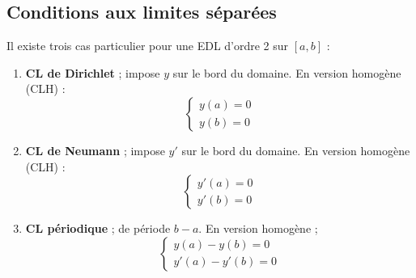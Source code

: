 \documentclass	[11pt, a4paper, openany]{book}
\begin{document}
			\subsection{Conditions aux limites séparées}
			Il existe trois cas particulier pour une EDL d'ordre 2 sur $[a,b]$ :
			\begin{enumerate}
				\item \textbf{CL de Dirichlet} ; impose $y$ sur le bord du domaine. En version homogène (CLH) :
				      \begin{equation}
				      	\left\{\begin{array}{l}
				      	y(a) = 0\\
				      	y(b) = 0
				      	\end{array}\right.
				      \end{equation}
				\item \textbf{CL de Neumann} ; impose $y'$ sur le bord du domaine. En version homogène (CLH) :
				      \begin{equation}
				      	\left\{\begin{array}{l}
				      	y'(a) = 0\\
				      	y'(b) = 0
				      	\end{array}\right.
				      \end{equation}
				\item \textbf{CL périodique} ; de période $b-a$. En version homogène ;
				      \begin{equation}
				      	\left\{\begin{array}{l}
				      	y(a)-y(b) = 0\\
				      	y'(a) - y'(b) = 0
				      	\end{array}\right.
				      \end{equation}
			\end{enumerate}
\end{document}
